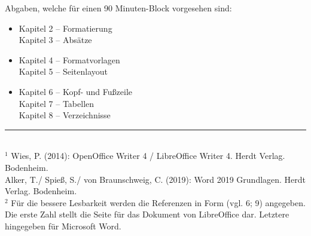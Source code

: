 \documentclass[a4paper, 11pt]{scrartcl}
\begin{document}
	\begin{flushleft}
		Abgaben, welche für einen 90 Minuten-Block vorgesehen sind:
		\begin{itemize}
			\item Kapitel 2 – Formatierung \\ Kapitel 3 – Absätze \vspace{3mm}
			\item Kapitel 4 – Formatvorlagen \\ Kapitel 5 – Seitenlayout \vspace{3mm}
			\item Kapitel 6 – Kopf- und Fußzeile \\ Kapitel 7 – Tabellen \\ Kapitel 8 – Verzeichnisse
		\end{itemize}
	\end{flushleft}
	
	\vfill
		
	\begin{justify}			
		\rule{50.8mm}{0.3mm} \\
		\small
		$^{1}$ \hspace{2mm} Wies, P. (2014): OpenOffice Writer 4 / LibreOffice Writer 4. Herdt Verlag. Bodenheim. \\ \hspace{3mm} Alker, T./ Spieß, S./ von Braunschweig, C. (2019): Word 2019 Grundlagen. Herdt Verlag. Bodenheim. \vspace{2mm} \\
		$^{2}$ \hspace{2mm} Für die bessere Lesbarkeit werden die Referenzen in Form (vgl. 6; 9) angegeben. \\ Die erste Zahl stellt die Seite für das Dokument von LibreOffice dar. Letztere hingegeben für Microsoft Word.
	\end{justify}
	
	\newpage
\end{document}

